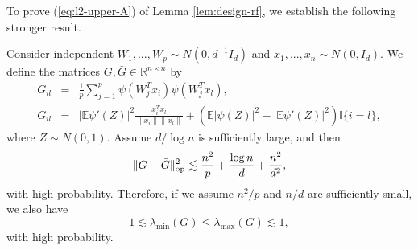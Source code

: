 To prove (\ref{eq:l2-upper-A}) of Lemma \ref{lem:design-rf}, we establish the following stronger result.
\begin{lemma}\label{lem:lim-G}
Consider independent $W_1,...,W_p\sim N(0,d^{-1}I_d)$ and $x_1,...,x_n\sim N(0,I_d)$. We define the matrices $G,\bar{G}\in\mathbb{R}^{n\times n}$ by
\begin{eqnarray*}
G_{il} &=& \frac{1}{p}\sum_{j=1}^p\psi(W^T_jx_i)\psi(W_j^Tx_l), \\
\bar{G}_{il} &=& |\mathbb{E}\psi'(Z)|^2\frac{x_i^Tx_l}{\|x_i\|\|x_l\|} + \left(\mathbb{E}|\psi(Z)|^2-|\mathbb{E}\psi'(Z)|^2\right)\mathbb{I}\{i=l\},
\end{eqnarray*}
where $Z\sim N(0,1)$.
Assume $d/\log n$ is sufficiently large, and then
$$\|G-\bar{G}\|_{\rm op}^2\lesssim \frac{n^2}{p} + \frac{\log n}{d} + \frac{n^2}{d^2},$$
with high probability. Therefore, if we assume $n^2/p$ and $n/d$ are sufficiently small, we also have
\begin{equation}
1\lesssim\lambda_{\min}(G)\leq \lambda_{\max}(G)\lesssim 1, \label{eq:spectrum-G-bound}
\end{equation}
with high probability.
\end{lemma}
